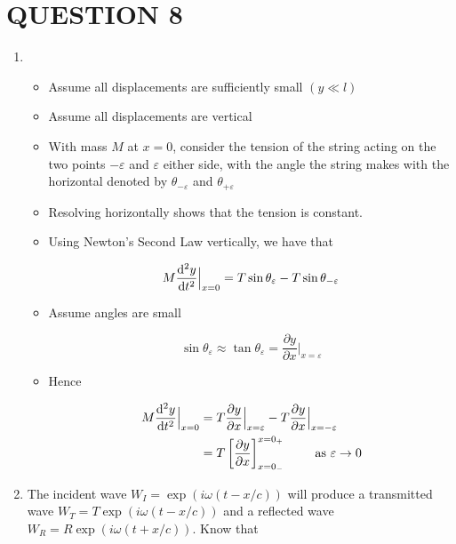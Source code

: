 \documentclass[a4paper]{article}
\begin{document}
\section{QUESTION 8}

	\begin{enumerate}
			\item \begin{itemize}
			\item Assume all displacements are sufficiently small $ ( y \ll l) $
			\item Assume all displacements are vertical
			\item With mass $ M $ at $ x = 0 $, consider the tension of the string acting on the two points $ - \varepsilon $ and $ \varepsilon $ either side, with the angle the string makes with the horizontal denoted by $ \theta_{- \varepsilon} $ and $ \theta_{+\varepsilon} $
			\item Resolving horizontally shows that the tension is constant.
			\item Using Newton's Second Law vertically, we have that 
			
			\begin{align*}
			M  \frac{\mathrm{d}^{2} y }{\mathrm{d} t^{2}} \Big|_{x=0} & = T \sin \theta_{\varepsilon} - T \sin \theta_{-\varepsilon} \\
			\end{align*} 
			
			
			\item Assume angles are small
			
			\[ \sin \theta_{\varepsilon} \approx \tan \theta_{\varepsilon} = \frac{\partial y }{\partial x} \Big|_{x = \varepsilon} \]
			
			\item Hence
			
			\begin{align*}
			M  \frac{\mathrm{d}^{2} y }{\mathrm{d} t^{2}} \Big|_{x=0} & = T \frac{\partial y }{\partial x} \Big|_{x = \varepsilon} - T \frac{\partial y }{\partial x} \Big|_{x = -\varepsilon} \\
			& = T \left[  \frac{\partial y }{\partial x} \right]_{x = 0_{-}}^{x = 0_{+}} \qquad \text{ as } \varepsilon \to 0  
			\end{align*} 
			
			
		\end{itemize}
	
	\item The incident wave $ W_{I} =  \exp(i \omega(t - x/c) )$ will produce a transmitted wave $ W_{T} = T \exp( i \omega(t - x / c)  ) $ and a reflected wave $ W_{R} = R\exp(i \omega(t + x/c)) $.  Know that
	

\end{enumerate}
\end{document}
